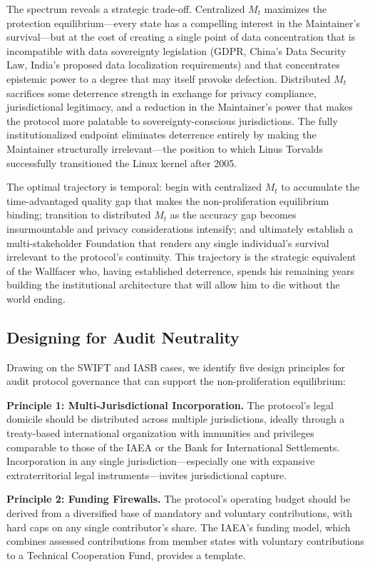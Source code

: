 \documentclass[12pt,a4paper]{ctexart}
\theoremstyle{definition}
\theoremstyle{remark}
\begin{document}
The spectrum reveals a strategic trade-off. Centralized $M_t$ maximizes the protection equilibrium—every state has a compelling interest in the Maintainer's survival—but at the cost of creating a single point of data concentration that is incompatible with data sovereignty legislation (GDPR, China's Data Security Law, India's proposed data localization requirements) and that concentrates epistemic power to a degree that may itself provoke defection. Distributed $M_t$ sacrifices some deterrence strength in exchange for privacy compliance, jurisdictional legitimacy, and a reduction in the Maintainer's power that makes the protocol more palatable to sovereignty-conscious jurisdictions. The fully institutionalized endpoint eliminates deterrence entirely by making the Maintainer structurally irrelevant—the position to which Linus Torvalds successfully transitioned the Linux kernel after 2005.

The optimal trajectory is temporal: begin with centralized $M_t$ to accumulate the time-advantaged quality gap that makes the non-proliferation equilibrium binding; transition to distributed $M_t$ as the accuracy gap becomes insurmountable and privacy considerations intensify; and ultimately establish a multi-stakeholder Foundation that renders any single individual's survival irrelevant to the protocol's continuity. This trajectory is the strategic equivalent of the Wallfacer who, having established deterrence, spends his remaining years building the institutional architecture that will allow him to die without the world ending.

\subsection{Designing for Audit Neutrality}

Drawing on the SWIFT and IASB cases, we identify five design principles for audit protocol governance that can support the non-proliferation equilibrium:

\textbf{Principle 1: Multi-Jurisdictional Incorporation.} The protocol's legal domicile should be distributed across multiple jurisdictions, ideally through a treaty-based international organization with immunities and privileges comparable to those of the IAEA or the Bank for International Settlements. Incorporation in any single jurisdiction—especially one with expansive extraterritorial legal instruments—invites jurisdictional capture.

\textbf{Principle 2: Funding Firewalls.} The protocol's operating budget should be derived from a diversified base of mandatory and voluntary contributions, with hard caps on any single contributor's share. The IAEA's funding model, which combines assessed contributions from member states with voluntary contributions to a Technical Cooperation Fund, provides a template.
\end{document}
